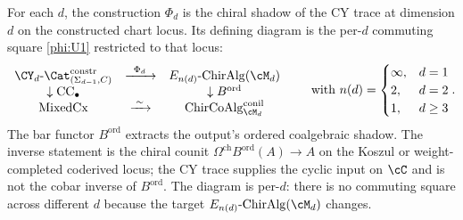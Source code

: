 \begin{remark}
\label{rem:phi-platonic-slogan}
For each $d$, the construction $\Phi_d$ is the chiral shadow of the CY trace at dimension $d$ on the constructed chart locus. Its defining diagram is the per-$d$ commuting square \textup{\eqref{phi:U1}} restricted to that locus:
\[
\begin{array}{ccc}
 \CY_d\text{-}\Cat^{\mathrm{constr}}_{(\Sigma_{d-1},C)} & \xrightarrow{\;\;\Phi_d\;\;} & E_{n(d)}\text{-}\mathrm{ChirAlg}(\cM_d) \\
 \downarrow{\mathrm{CC}_\bullet} & & \downarrow{B^{\mathrm{ord}}} \\
 \mathrm{MixedCx} & \xrightarrow{\;\sim\;} & \mathrm{ChirCoAlg}^{\mathrm{conil}}_{\cM_d}
\end{array}
\qquad\text{with }
n(d) = \begin{cases} \infty, & d = 1 \\ 2, & d = 2 \\ 1, & d \geq 3 \end{cases}.
\]
The bar functor $B^{\mathrm{ord}}$ extracts the output's ordered
coalgebraic shadow. The inverse statement is the chiral counit
\(\Omega^{\mathrm{ch}}B^{\mathrm{ord}}(A)\to A\) on the Koszul or
weight-completed coderived locus; the CY trace supplies the cyclic
input on \(\cC\) and is not the cobar inverse of
\(B^{\mathrm{ord}}\). The diagram is per-$d$: there is no commuting
square across different $d$ because the target
$E_{n(d)}\text{-}\mathrm{ChirAlg}(\cM_d)$ changes.
\end{remark}

